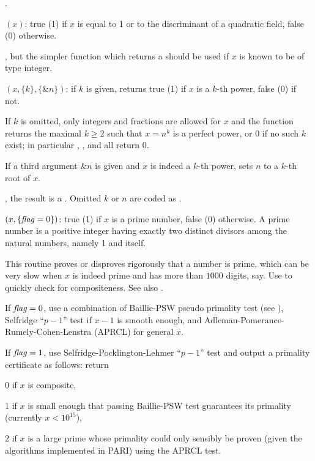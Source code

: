 .

$(x)$: true (1) if $x$ is equal to 1 or to the
discriminant of a quadratic field, false (0) otherwise.

, but the simpler function 
which returns a  should be used if $x$ is known to be of type
integer.

$(x,\{k\}, \{\&n\})$:
if $k$ is given, returns true (1) if $x$ is a $k$-th power, false
(0) if not.

If $k$ is omitted, only integers and fractions are allowed for $x$ and the
function returns the maximal $k \geq 2$ such that $x = n^k$ is a perfect
power, or 0 if no such $k$ exist; in particular ,
, and  all return $0$.

If a third argument $\&n$ is given and $x$ is indeed a $k$-th power, sets
$n$ to a $k$-th root of $x$.

, the result is a . Omitted $k$ or $n$
are coded as .

$(x,\{\hbox{\it f\kern0pt lag\/}=0\})$: true (1) if $x$ is a prime
number, false (0) otherwise. A prime number is a positive integer having
exactly two distinct divisors among the natural numbers, namely 1 and
itself. 

This routine proves or disproves rigorously that a number is prime, which can
be very slow when $x$ is indeed prime and has more than $1000$ digits, say.
Use  to quickly check for compositeness. See also
.

If $\hbox{\it f\kern0pt lag\/}=0$, use a combination of Baillie-PSW pseudo primality test (see
), Selfridge ``$p-1$'' test if $x-1$ is smooth enough, and
Adleman-Pomerance-Rumely-Cohen-Lenstra (APRCL) for general $x$.

If $\hbox{\it f\kern0pt lag\/}=1$, use Selfridge-Pocklington-Lehmer ``$p-1$'' test and output a
primality certificate as follows: return 

\item 0 if $x$ is composite,

\item 1 if $x$ is small enough that passing Baillie-PSW test guarantees
its primality (currently $x < 10^{15}$),

\item $2$ if $x$ is a large prime whose primality could only sensibly be
proven (given the algorithms implemented in PARI) using the APRCL test.

